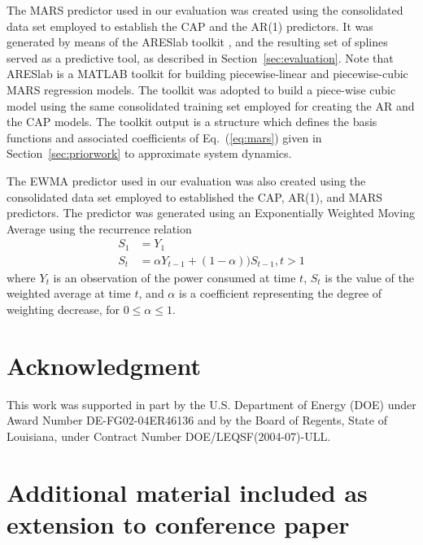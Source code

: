 \documentclass[acmtaco]{acmtrans2m}
\newcommand{\equationname}{Eq.}
\begin{document}
The MARS predictor used in our evaluation was created using the
consolidated data set employed to establish the CAP and the AR(1)
predictors.  It was generated by means of the ARESlab toolkit
\cite{Jekabsons2010}, and the resulting set of splines served as a
predictive tool, as described in Section~\ref{sec:evaluation}.  Note
that ARESlab is a MATLAB toolkit for building piecewise-linear and
piecewise-cubic MARS regression models.  The toolkit was adopted to
build a piece-wise cubic model using the same consolidated training set
employed for creating the AR and the CAP models.  The toolkit output is
a structure which defines the basis functions and associated
coefficients of \equationname~(\ref{eq:mars}) given in
Section~\ref{sec:priorwork} to approximate system dynamics.

The EWMA predictor used in our evaluation was also created using the
consolidated data set employed to established the CAP, AR(1), and MARS
predictors.  The predictor was generated using an Exponentially Weighted
Moving Average using the recurrence relation
\begin{align}
  \label{eq:1}
  S_{1}&=Y_{1}\\
  S_{t}&=\alpha Y_{t-1}+(1-\alpha))S_{t-1}, t>1
\end{align}
where $Y_{t}$ is an observation of the power consumed at time $t$,
$S_{t}$ is the value of the weighted average at time $t$, and $\alpha$
is a coefficient representing the degree of weighting decrease, for
$0\leq \alpha \leq1$.

\section*{Acknowledgment}
\label{sec:acknowledgement}
This work was supported in part by the U.S. Department of Energy
(DOE) under Award Number DE-FG02-04ER46136 and by the Board of Regents,
State of Louisiana, under Contract Number DOE/LEQSF(2004-07)-ULL.
\label{sec:references}


\clearpage
\section*{Additional material included as extension to conference paper}
\end{document}

